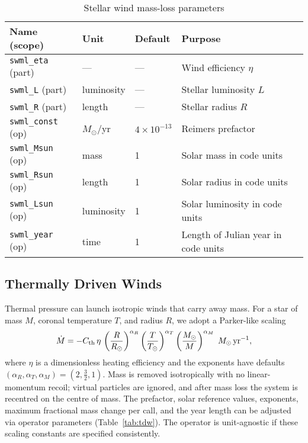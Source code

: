 \documentclass[11pt]{article}
\begin{document}
\begin{table}[h]
\centering\footnotesize
\caption{Stellar wind mass-loss parameters}
\label{tab:swml}
\begin{tabular}{@{}llll@{}}
\toprule
Name (scope) & Unit & Default & Purpose \\
\midrule
\texttt{swml\_eta} (part) & — & — & Wind efficiency $\eta$\\
\texttt{swml\_L}   (part) & luminosity & — & Stellar luminosity $L$\\
\texttt{swml\_R}   (part) & length & — & Stellar radius $R$\\[0.2em]
\texttt{swml\_const} (op) & $M_\odot$/yr & $4\times10^{-13}$ & Reimers prefactor\\
\texttt{swml\_Msun}  (op) & mass & 1 & Solar mass in code units\\
\texttt{swml\_Rsun}  (op) & length & 1 & Solar radius in code units\\
\texttt{swml\_Lsun}  (op) & luminosity & 1 & Solar luminosity in code units\\
\texttt{swml\_year}  (op) & time & 1 & Length of Julian year in code units\\
\bottomrule
\end{tabular}
\end{table}

\subsection{Thermally Driven Winds}
\label{sec:tdw}

Thermal pressure can launch isotropic winds that carry away mass. For a star
of mass $M$, coronal temperature $T$, and radius $R$, we adopt a Parker-like
scaling
\[
\dot M = -C_{\rm th}\,\eta\,\left(\frac{R}{R_\odot}\right)^{\alpha_R}
                   \left(\frac{T}{T_\odot}\right)^{\alpha_T}
                   \left(\frac{M_\odot}{M}\right)^{\alpha_M}
\;M_\odot\,\mathrm{yr}^{-1},
\]
where $\eta$ is a dimensionless heating efficiency and the exponents have
defaults $(\alpha_R,\alpha_T,\alpha_M)=(2,\tfrac{3}{2},1)$.  Mass is removed
isotropically with no linear-momentum recoil; virtual particles are ignored,
and after mass loss the system is recentred on the centre of mass.  The
prefactor, solar reference values, exponents, maximum fractional mass change
per call, and the year length can be adjusted via operator parameters
(Table~\ref{tab:tdw}). The operator is unit-agnostic if these scaling
constants are specified consistently.
\end{document}
